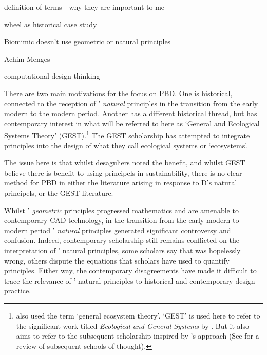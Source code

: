 \documentclass[a4paper, 12pt]{article}
\begin{document}
definition of terms - why they are important to me

wheel as historical case study

Biomimic doesn't use geometric or natural principles 

Achim Menges

computational design thinking 




There are two main motivations for the focus on PBD. One is historical, connected to the reception of \citeauthor{descartes_principles_1982}' \textit{natural} principles in the transition from the early modern to the modern period. Another has a different historical thread, but has contemporary interest in what will be referred to here as `General and Ecological Systems Theory' (GEST).\footnote{\citet[p.~430]{odum_limits_1963} also used the term `general ecosystem theory'. `GEST' is used here to refer to the  significant work titled \textit{Ecological and General Systems} by \citet{odum_ecological_1994}. But it also aims to refer to the subsequent scholarship inspired by \citeauthor{odum_ecological_1994}'s approach (See \citet{hall_maximum_1995} for a review of subsequent schools of thought).} The GEST scholarship has attempted to integrate principles into the design of what they call ecological systems or `ecosystems'. 

The issue here is that whilst desaguliers noted the benefit, and whilst GEST believe there is benefit to using principels in sustainability, there is no clear method for PBD in either the literature arising in response to D's natural principels, or the GEST literature.  

Whilst \citeauthor{descartes_principles_1982}' \textit{geometric} principles progressed mathematics and are amenable to contemporary CAD technology, in the transition from the early modern to modern period \citeauthor{descartes_principles_1982}' \textit{natural} principles generated significant controversy and confusion. Indeed, contemporary scholarship still remains conflicted on the interpretation of \citeauthor{descartes_principles_1982}' natural principles, some scholars say that \citeauthor{descartes_principles_1982} was hopelessly wrong, others dispute the equations that scholars have used to quantify \citeauthor{descartes_principles_1982} principles. Either way, the contemporary disagreements have made it difficult to trace the relevance of \citeauthor{descartes_principles_1982}' natural principles to historical and contemporary design practice. 
\end{document}
